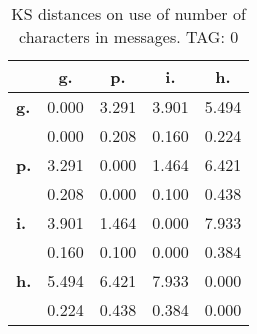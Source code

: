 \begin{table}[h!]
\begin{center}
\begin{tabular}{| l || c | c | c | c |}\hline
 & {\bf g.} & {\bf p.} & {\bf i.} & {\bf h.} \\\hline\hline
{\bf g.} & 0.000 & 3.291 & 3.901 & 5.494 \\
{\bf } & 0.000 & 0.208 & 0.160 & 0.224 \\\hline
{\bf p.} & 3.291 & 0.000 & 1.464 & 6.421 \\
{\bf } & 0.208 & 0.000 & 0.100 & 0.438 \\\hline
{\bf i.} & 3.901 & 1.464 & 0.000 & 7.933 \\
{\bf } & 0.160 & 0.100 & 0.000 & 0.384 \\\hline
{\bf h.} & 5.494 & 6.421 & 7.933 & 0.000 \\
{\bf } & 0.224 & 0.438 & 0.384 & 0.000 \\\hline
\end{tabular}
\caption{KS distances on use of number of characters in messages. TAG: 0}
\end{center}
\end{table}